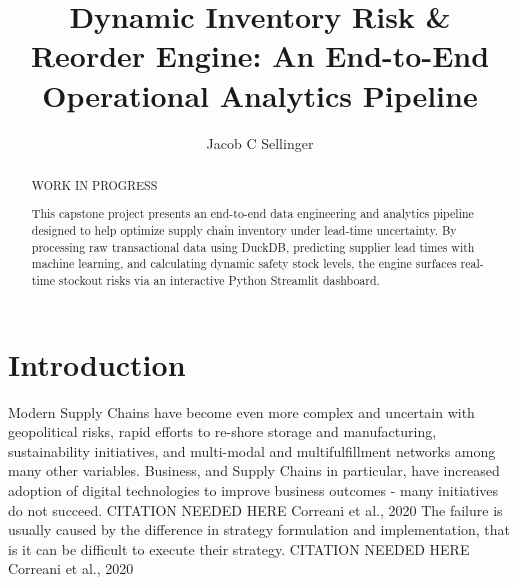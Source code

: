 \documentclass[runningheads]{llncs}
\begin{document}
\title{Dynamic Inventory Risk \& Reorder Engine: An End-to-End Operational Analytics Pipeline}


\author{Jacob C Sellinger }



\maketitle              %

\begin{abstract}
    WORK IN PROGRESS

This capstone project presents an end-to-end data engineering and analytics pipeline designed to help optimize supply chain inventory under lead-time uncertainty. By processing raw transactional data using DuckDB, predicting supplier lead times with machine learning, and calculating dynamic safety stock levels, the engine surfaces real-time stockout risks via an interactive Python Streamlit dashboard.


\end{abstract}


\section{Introduction}


Modern Supply Chains have become even more complex and uncertain with geopolitical risks, rapid efforts to re-shore storage and manufacturing, sustainability initiatives, and multi-modal and multifulfillment networks among many other variables. Business, and Supply Chains in particular, have increased adoption of digital technologies to improve business outcomes - many initiatives do not succeed. CITATION NEEDED HERE Correani et al., 2020 The failure is usually caused by the difference in strategy formulation and implementation, that is it can be difficult to execute their strategy. CITATION NEEDED HERE Correani et al., 2020
\end{document}
